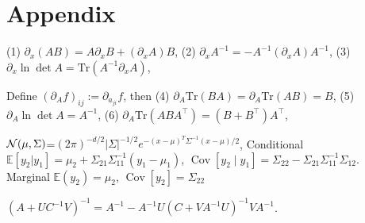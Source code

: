 \section{Appendix}
\begin{scriptsize}
    (1) $\partial_x (AB) = A\partial_x B+(\partial_x A)B$, 
    (2) $\partial_x A^{-1} = -A^{-1}(\partial_x A)A^{-1}$, 
    (3) $\partial_x\ln\det A = \mathrm{Tr}\left(A^{-1}\partial_x A\right)$,
    
    Define $(\partial_A f)_{ij}:=\partial_{a_{ji}} f$, then
    (4) $\partial_A\mathrm{Tr}(BA) = \partial_A\mathrm{Tr}(AB) = B$,
    (5) $\partial_A\ln\det A=A^{-1}$,
    (6) $\partial_A\mathrm{Tr}(ABA^{\top}) = (B+B^{\top})A^{\top}$,
    
    $\mathcal{N}(\mu,\Sigma)$=$(2\pi)^{-d/2}|\Sigma|^{-1/2}e^{-(x-\mu)^T \Sigma^{-1} (x-\mu)/2}$, 
    Conditional $\mathbb{E} [y_2 | y_1] = \mu_2+\Sigma_{21}\Sigma_{11}^{-1} (y_1-\mu_1)$, $\operatorname{Cov}[y_2\mid y_1] = \Sigma_{22} - \Sigma_{21}\Sigma_{11}^{-1}\Sigma_{12}$. 
    Marginal $\mathbb{E} (y_2 ) = \mu_2$, $\operatorname{Cov}[y_2] = \Sigma_{22}$
    
    $(A + U C^{-1} V)^{-1} = A^{-1} - A^{-1}U(C+VA^{-1}U)^{-1}V A^{-1}$.
\end{scriptsize}




